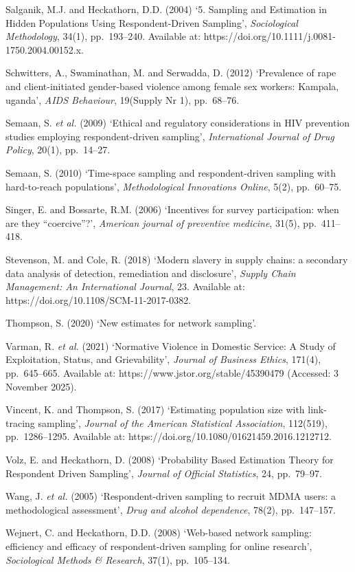 \documentclass[
  12pt,
  letterpaper,
  DIV=11,
  numbers=noendperiod]{scrartcl}
\begin{document}
Salganik, M.J. and Heckathorn, D.D. (2004) `5. Sampling and Estimation
in Hidden Populations Using Respondent-Driven Sampling',
\emph{Sociological Methodology}, 34(1), pp.~193--240. Available at:
https://doi.org/10.1111/j.0081-1750.2004.00152.x.

Schwitters, A., Swaminathan, M. and Serwadda, D. (2012) `Prevalence of
rape and client-initiated gender-based violence among female sex
workers: Kampala, uganda', \emph{AIDS Behaviour}, 19(Supply Nr 1),
pp.~68--76.

Semaan, S. \emph{et al.} (2009) `Ethical and regulatory considerations
in HIV prevention studies employing respondent-driven sampling',
\emph{International Journal of Drug Policy}, 20(1), pp.~14--27.

Semaan, S. (2010) `Time-space sampling and respondent-driven sampling
with hard-to-reach populations', \emph{Methodological Innovations
Online}, 5(2), pp.~60--75.

Singer, E. and Bossarte, R.M. (2006) `Incentives for survey
participation: when are they ``coercive''?', \emph{American journal of
preventive medicine}, 31(5), pp.~411--418.

Stevenson, M. and Cole, R. (2018) `Modern slavery in supply chains: a
secondary data analysis of detection, remediation and disclosure',
\emph{Supply Chain Management: An International Journal}, 23. Available
at: https://doi.org/10.1108/SCM-11-2017-0382.

Thompson, S. (2020) `New estimates for network sampling'.

Varman, R. \emph{et al.} (2021) `Normative Violence in Domestic Service:
A Study of Exploitation, Status, and Grievability', \emph{Journal of
Business Ethics}, 171(4), pp.~645--665. Available at:
https://www.jstor.org/stable/45390479 (Accessed: 3 November 2025).

Vincent, K. and Thompson, S. (2017) `Estimating population size with
link-tracing sampling', \emph{Journal of the American Statistical
Association}, 112(519), pp.~1286--1295. Available at:
https://doi.org/10.1080/01621459.2016.1212712.

Volz, E. and Heckathorn, D. (2008) `Probability Based Estimation Theory
for Respondent Driven Sampling', \emph{Journal of Official Statistics},
24, pp.~79--97.

Wang, J. \emph{et al.} (2005) `Respondent-driven sampling to recruit
MDMA users: a methodological assessment', \emph{Drug and alcohol
dependence}, 78(2), pp.~147--157.

Wejnert, C. and Heckathorn, D.D. (2008) `Web-based network sampling:
efficiency and efficacy of respondent-driven sampling for online
research', \emph{Sociological Methods \& Research}, 37(1), pp.~105--134.
\end{document}
